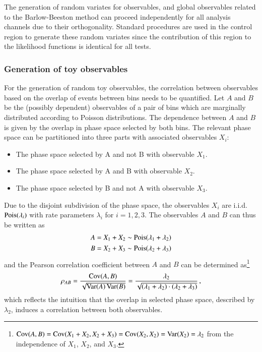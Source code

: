 The generation of random variates for observables, and global
observables related to the Barlow-Beeston method can proceed
independently for all analysis channels due to their
orthogonality. Standard procedures are used in the control region to
generate these random variates since the contribution of this region
to the likelihood functions is identical for all tests.


\subsubsection{Generation of toy observables}

For the generation of random toy observables, the correlation between
observables based on the overlap of events between bins needs to be
quantified. Let $A$ and $B$ be the (possibly dependent) observables of
a pair of bins which are marginally distributed according to Poisson
distributions. The dependence between $A$ and $B$ is given by the
overlap in phase space selected by both bins. The relevant phase space
can be partitioned into three parts with associated observables $X_i$:
\begin{itemize}
\item The phase space selected by A and not B with observable $X_1$.
\item The phase space selected by A and B with observable $X_2$.
\item The phase space selected by B and not A with observable $X_3$.
\end{itemize}
Due to the disjoint subdivision of the phase space, the observables
$X_i$ are i.i.d.\ $\operatorname{Pois}(\lambda_i)$ with rate parameters $\lambda_i$
for $i = 1, 2, 3$. The observables $A$ and $B$ can thus be written as
\begin{align*}
  A &= X_1 + X_2 \sim \operatorname{Pois}(\lambda_1 + \lambda_2) \\
  B &= X_2 + X_3 \sim \operatorname{Pois}(\lambda_2 + \lambda_3)
\end{align*}
and the Pearson correlation coefficient between $A$ and $B$ can be
determined
as\footnote{$\operatorname{Cov}(A,B) = \operatorname{Cov}(X_1 + X_2, X_2 + X_3) = \operatorname{Cov}(X_2, X_2) =
  \operatorname{Var}(X_2) = \lambda_2$ from the independence of $X_1$, $X_2$, and
  $X_3$.}
\begin{align*}
  \rho_{AB} = \frac{\operatorname{Cov}(A, B)}{\sqrt{\operatorname{Var}(A)\operatorname{Var}(B)}}
  = \frac{\lambda_2}{\sqrt{(\lambda_1 + \lambda_2) \cdot (\lambda_2 + \lambda_3)}} \,\text{,}
\end{align*}
which reflects the intuition that the overlap in selected phase space,
described by $\lambda_2$, induces a correlation between both
observables.

